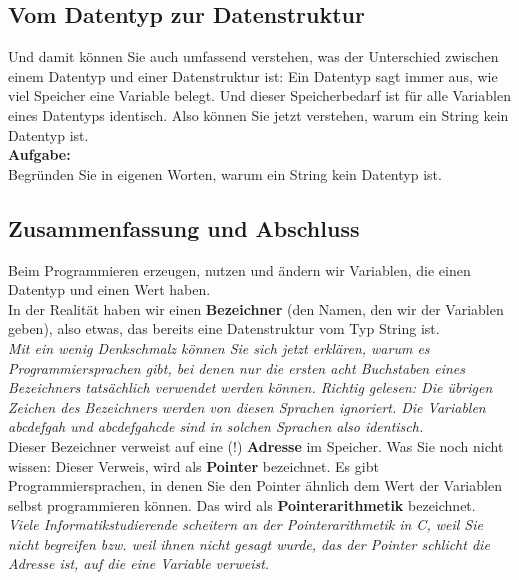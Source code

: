 \subsection{Vom Datentyp zur Datenstruktur}

Und damit können Sie auch umfassend verstehen, was der Unterschied zwischen einem Datentyp und einer Datenstruktur ist: Ein Datentyp sagt immer aus, wie viel Speicher eine Variable belegt. Und dieser Speicherbedarf ist für alle Variablen eines Datentyps identisch. Also können Sie jetzt verstehen, warum ein String kein Datentyp ist.\\

\textbf{Aufgabe:}\\

Begründen Sie in eigenen Worten, warum ein String kein Datentyp ist.

\subsection{Zusammenfassung und Abschluss}

Beim Programmieren erzeugen, nutzen und ändern wir Variablen, die einen Datentyp und einen Wert haben.\\

In der Realität haben wir einen \textbf{Bezeichner} (den Namen, den wir der Variablen geben), also etwas, das bereits eine Datenstruktur vom Typ String ist.\\

\emph{Mit ein wenig Denkschmalz können Sie sich jetzt erklären, warum es Programmiersprachen gibt, bei denen nur die ersten acht Buchstaben eines Bezeichners tatsächlich verwendet werden können. Richtig gelesen: Die übrigen Zeichen des Bezeichners werden von diesen Sprachen ignoriert. Die Variablen abcdefgah und abcdefgahcde sind in solchen Sprachen also identisch.}\\

Dieser Bezeichner verweist auf eine (!) \textbf{Adresse} im Speicher. Was Sie noch nicht wissen: Dieser Verweis, wird als \textbf{Pointer} bezeichnet. Es gibt Programmiersprachen, in denen Sie den Pointer ähnlich dem Wert der Variablen selbst programmieren können. Das wird als \textbf{Pointerarithmetik} bezeichnet.\\

\emph{Viele Informatikstudierende scheitern an der Pointerarithmetik in C, weil Sie nicht begreifen bzw. weil ihnen nicht gesagt wurde, das der Pointer schlicht die Adresse ist, auf die eine Variable verweist.}\\

